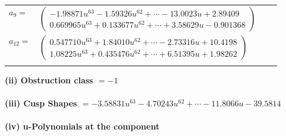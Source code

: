 \documentclass[1p]{elsarticle_modified}
\theoremstyle{definition}
\begin{document}
\begin{tabular}{m{7pt} m{180pt} m{7pt} m{180pt} }
\flushright $a_{9}=$&$\begin{pmatrix}-1.98871 u^{63}-1.59326 u^{62}+\cdots-13.0023 u+2.89409\\0.669965 u^{63}+0.133677 u^{62}+\cdots+3.58629 u-0.901368\end{pmatrix}$ \\
\flushright $a_{12}=$&$\begin{pmatrix}0.547710 u^{63}+1.84010 u^{62}+\cdots-2.73316 u+10.4198\\1.08225 u^{63}+0.435476 u^{62}+\cdots+6.51395 u+1.98262\end{pmatrix}$\\&\end{tabular}
\flushleft \textbf{(ii) Obstruction class $= -1$}\\~\\
\flushleft \textbf{(iii) Cusp Shapes $= -3.58831 u^{63}-4.70243 u^{62}+\cdots-11.8066 u-39.5814$}\\~\\
\newpage\renewcommand{\arraystretch}{1}
\flushleft \textbf{(iv) u-Polynomials at the component}\newline \\
\end{document}
